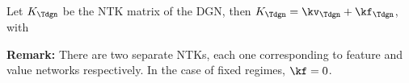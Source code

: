 \begin{proposition}\label{prop:ntks} Let $K_{\Tdgn}$ be the NTK matrix of the DGN, then $K_{\Tdgn}=\kv_{\Tdgn}+\kf_{\Tdgn}$, with
\begin{table}[h]
\end{table}
\end{proposition}
\textbf{Remark:} There are two separate NTKs, each one corresponding to feature and value networks respectively. In the case of fixed regimes, $\kf=0$. 

